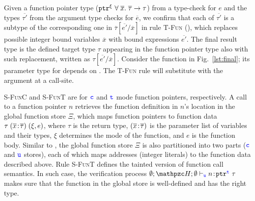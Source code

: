 Given a function pointer type ($\mathtt{ptr}^{\xi}~{\forall \;\overline{x}.\;{\overline{\tau}}\to\tau}$)
from a type-check for $e$ and the types $\overline{\tau'}$ from the argument type checks for $\overline{e}$,
we confirm that each of $\overline{\tau'}$ is
a subtype of the corresponding one in $\overline{\tau}[\overline{e'} / \overline{x}]$ 
in rule \textsc{T-Fun} (),
which replaces possible integer bound variables $\overline{x}$ with bound expressions $\overline{e'}$.
The final result type is the defined target type $\tau$ appearing in the function pointer type
also with such replacement, written as $\tau[\overline{e'} / \overline{x}]$.
Consider the  function in
Fig.~\ref{lst:final}; its parameter type for  
depends on . The \textsc{T-Fun} rule will substitute 
 with the argument at a call-site.

\textsc{S-FunC} and \textsc{S-FunT} are
for $\textcolor{blue}{\texttt{c}}$ and $\textcolor{blue}{\texttt{t}}$ mode function pointers, respectively. 
A call to a function pointer $n$ retrieves
 the function definition in $n$'s location in the global function store $\Xi$,
which maps function pointers to
function data $\tau\;({\overline{x}}\!:\!{\overline{\tau}})\;(\xi,e)$, where
$\tau$ is the return type, $({\overline{x}}\!:\!{\overline{\tau}})$
is the parameter list of variables and their types, 
$\xi$ determines the mode of the function, and $e$ is the
function body. 
Similar to \heap, the global function store $\Xi$ is also partitioned into
two parts ($\textcolor{blue}{\texttt{c}}$ and $\textcolor{blue}{\texttt{u}}$ stores), each of which
maps addresses (integer literals) to the function data described above.
Rule \textsc{S-FunT} defines the tainted version of function call semantics.
In such case, the verification process 
$\emptyset;\heap ; \emptyset \vdash_{\umode}\evalue{n}{\tptr{\tau}{\tmode}}$
makes sure that the function in the global store is well-defined and has the right type.

